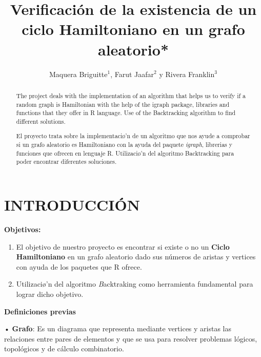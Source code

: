 \documentclass[journal]{IEEEtran}
\title{\LARGE \bf
		Verificaci{\'o}n de la existencia de un ciclo Hamiltoniano en un grafo aleatorio*}
\author{Maquera Briguitte$^{1}$, Farut Jaafar$^{2}$ y Rivera Franklin$^{3}$}
\begin{document}
\maketitle
\thispagestyle{empty}
\pagestyle{empty}


\begin{abstract}
	
	The project deals with the implementation of an algorithm that helps us to verify if a random graph is Hamiltonian with the help of the igraph package, libraries and functions that they offer in R language. Use of the Backtracking algorithm to find different solutions.
\end{abstract}

\begin{abstract}
	
	El proyecto trata sobre la implementaci{\o'}n de un algoritmo que nos ayude a comprobar si un grafo aleatorio es Hamiltoniano  con la ayuda del paquete \textit{igraph}, librerias y funciones que ofrecen en lenguaje R. Utilizaci{\o'}n del algoritmo Backtracking para poder encontrar diferentes soluciones.

\end{abstract}

	
\section{\large\bf INTRODUCCI{\'O}N}
 
 {\bf Objetivos:}\\
 \begin{enumerate}
 	\item El objetivo de nuestro proyecto es encontrar si existe o no un {\bf Ciclo Hamiltoniano} en un grafo aleatorio dado sus números de aristas y vertices con ayuda de los paquetes que R ofrece.
 	\item Utilizaci{\o'}n del algoritmo {\textit Backtraking} como herramienta fundamental para lograr dicho objetivo.
 \end{enumerate}
\vspace{0.2mm}
{\bf Definiciones previas}\\
\vspace{0.2mm}

• \textbf{Grafo}: Es un diagrama que representa mediante vertices y aristas las relaciones entre pares de elementos y que se usa para resolver problemas l{\'o}gicos, topol{\'o}gicos y de c{\'a}lculo combinatorio.\\
\end{document}
